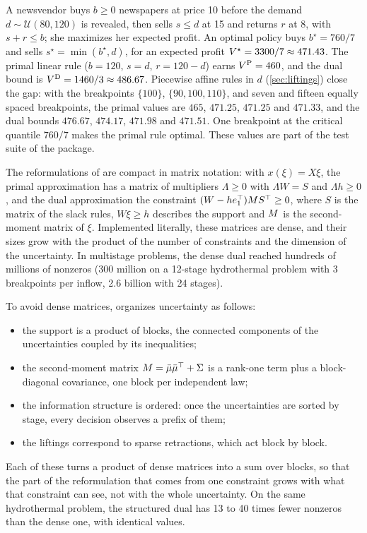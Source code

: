 \begin{example}
\label{ex:newsvendor}
A newsvendor buys $b \ge 0$ newspapers at price 10 before the demand $d \sim \mathcal{U}(80, 120)$ is revealed,
then sells $s \le d$ at 15 and returns $r$ at 8, with $s + r \le b$; she maximizes her expected profit.
An optimal policy buys $b^\star = 760/7$ and sells $s^\star = \min(b^\star, d)$,
for an expected profit $V^{\star} = 3300/7 \approx 471.43$.
The primal linear rule ($b = 120$, $s = d$, $r = 120 - d$) earns $V^{\mathrm{P}} = 460$,
and the dual bound is $V^{\mathrm{D}} = 1460/3 \approx 486.67$.
Piecewise affine rules in $d$ (\cref{sec:liftings}) close the gap:
with the breakpoints $\{100\}$, $\{90, 100, 110\}$, and seven and fifteen equally spaced breakpoints,
the primal values are $465$, $471.25$, $471.25$ and $471.33$,
and the dual bounds $476.67$, $474.17$, $471.98$ and $471.51$.
One breakpoint at the critical quantile $760/7$ makes the primal rule optimal.
These values are part of the test suite of the package.
\end{example}

The reformulations of \citet{KWG2011} are compact in matrix notation:
with $x(\xi) = X\xi$, the primal approximation has a matrix of multipliers $\Lambda \ge 0$ with $\Lambda W = S$ and $\Lambda h \ge 0$,
and the dual approximation the constraint $(W - he_1^\top) M S^\top \ge 0$,
where $S$ is the matrix of the slack rules, $W\xi \ge h$ describes the support and $M$ is the second-moment matrix of $\xi$.
Implemented literally, these matrices are dense, and their sizes grow with the product of the number of constraints and the dimension of the uncertainty.
In multistage problems, the dense dual reached hundreds of millions of nonzeros
(300 million on a 12-stage hydrothermal problem with 3 breakpoints per inflow, 2.6 billion with 24 stages).

To avoid dense matrices, \pkg{} organizes uncertainty as follows:
\begin{itemize}[nosep]
\item the support is a product of blocks, the connected components of the uncertainties coupled by its inequalities;
\item the second-moment matrix $M = \bar\mu\bar\mu^\top + \Sigma$ is a rank-one term plus a block-diagonal covariance, one block per independent law;
\item the information structure is ordered: once the uncertainties are sorted by stage, every decision observes a prefix of them;
\item the liftings correspond to sparse retractions, which act block by block.
\end{itemize}
Each of these turns a product of dense matrices into a sum over blocks,
so that the part of the reformulation that comes from one constraint grows with what that constraint can see,
not with the whole uncertainty.
On the same hydrothermal problem, the structured dual has 13 to 40 times fewer nonzeros than the dense one, with identical values.

